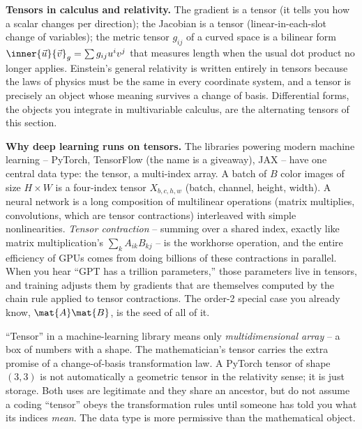 \begin{connectionbox}
\textbf{Tensors in calculus and relativity.} The gradient is a tensor (it tells you
how a scalar changes per direction); the Jacobian is a tensor (linear-in-each-slot
change of variables); the metric tensor $g_{ij}$ of a curved space is a bilinear
form $\inner{\vec{u}}{\vec{v}}_g = \sum g_{ij}u^i v^j$ that measures length when the
usual dot product no longer applies. Einstein's general relativity is written
entirely in tensors because the laws of physics must be the same in every coordinate
system, and a tensor is precisely an object whose meaning survives a change of
basis. Differential forms, the objects you integrate in multivariable calculus, are
the alternating tensors of this section.
\end{connectionbox}

\begin{applicationbox}
\textbf{Why deep learning runs on tensors.} The libraries powering modern machine
learning -- PyTorch, TensorFlow (the name is a giveaway), JAX -- have one central
data type: the tensor, a multi-index array. A batch of $B$ color images of size
$H\times W$ is a four-index tensor $X_{b,c,h,w}$ (batch, channel, height, width).
A neural network is a long composition of multilinear operations (matrix
multiplies, convolutions, which are tensor contractions) interleaved with simple
nonlinearities. \emph{Tensor contraction} -- summing over a shared index, exactly
like matrix multiplication's $\sum_k A_{ik}B_{kj}$ -- is the workhorse operation,
and the entire efficiency of GPUs comes from doing billions of these contractions
in parallel. When you hear ``GPT has a trillion parameters,'' those parameters live
in tensors, and training adjusts them by gradients that are themselves computed by
the chain rule applied to tensor contractions. The order-2 special case you already
know, $\mat{A}\mat{B}$, is the seed of all of it.
\end{applicationbox}

\begin{trapbox}
``Tensor'' in a machine-learning library means only \emph{multidimensional array} --
a box of numbers with a shape. The mathematician's tensor carries the extra promise
of a change-of-basis transformation law. A PyTorch tensor of shape $(3,3)$ is not
automatically a geometric tensor in the relativity sense; it is just storage. Both
uses are legitimate and they share an ancestor, but do not assume a coding
``tensor'' obeys the transformation rules until someone has told you what its
indices \emph{mean}. The data type is more permissive than the mathematical object.
\end{trapbox}

